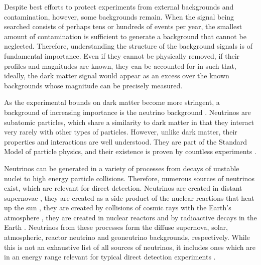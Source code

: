 \documentclass[b5paper, 10pt, twoside]{book}
\begin{document}
Despite best efforts to protect experiments from external backgrounds and contamination, however, some backgrounds remain. When the signal being searched consists of perhaps tens or hundreds of events per year, the smallest amount of contamination is sufficient to generate a background that cannot be neglected. Therefore, understanding the structure of the background signals is of fundamental importance. Even if they cannot be physically removed, if their profiles and magnitudes are known, they can be accounted for in such that, ideally, the dark matter signal would appear as an excess over the known backgrounds whose magnitude can be precisely measured.

As the experimental bounds on dark matter become more stringent, a background of increasing importance is the neutrino background \parencites{OHare2016, GaspertGiampaMorrissey2022}. Neutrinos are subatomic particles, which share a similarity to dark matter in that they interact very rarely with other types of particles. However, unlike dark matter, their properties and interactions are well understood. They are part of the Standard Model of particle physics, and their existence is proven by countless experiments \parencites{AharmimEtAl2013, AnEtAl2017, BasilicoEtAl2023, AbbasiEtAl2024, AbeEtAl2024, AbratenkoEtAl2024}. 

Neutrinos can be generated in a variety of processes from decays of unstable nuclei to high energy particle collisions. Therefore, numerous sources of neutrinos exist, which are relevant for direct detection. Neutrinos are created in distant supernovae \parencite{Beacom2010}, they are created as a side product of the nuclear reactions that heat up the sun \parencites{BergstromEtAl2016, OrebiGann2021}, they are created by collisions of cosmic rays with the Earth's atmosphere \parencite{BattistoniEtAl2005}, they are created in nuclear reactors \parencites{MuellerEtAl2011, MaEtAl2013} and by radioactive decays in the Earth \parencites{LudhovaZavatarelli2013, HuangEtAl2013}. Neutrinos from these processes form the diffuse supernova, solar, atmospheric, reactor neutrino and geoneutrino backgrounds, respectively. While this is not an exhaustive list of all sources of neutrinos, it includes ones which are in an energy range relevant for typical direct detection experiments \parencite{VitaglianoTamborraRaffelt2020}.
\end{document}
